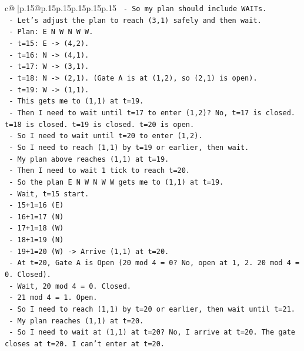 \documentclass{article}
\begin{document}
{\begin{supertabular}{c@{$\;$}|p{.15\linewidth}@{}p{.15\linewidth}p{.15\linewidth}p{.15\linewidth}p{.15\linewidth}p{.15\linewidth}}
{{{\texttt{   {-} So my plan should include WAITs.} \\
\texttt{   {-} Let's adjust the plan to reach (3,1) safely and then wait.} \\
\texttt{   {-} Plan: E N W N W W.} \\
\texttt{   {-} t=15: E {-}> (4,2).} \\
\texttt{   {-} t=16: N {-}> (4,1).} \\
\texttt{   {-} t=17: W {-}> (3,1).} \\
\texttt{   {-} t=18: N {-}> (2,1). (Gate A is at (1,2), so (2,1) is open).} \\
\texttt{   {-} t=19: W {-}> (1,1).} \\
\texttt{   {-} This gets me to (1,1) at t=19.} \\
\texttt{   {-} Then I need to wait until t=17 to enter (1,2)? No, t=17 is closed. t=18 is closed. t=19 is closed. t=20 is open.} \\
\texttt{   {-} So I need to wait until t=20 to enter (1,2).} \\
\texttt{   {-} So I need to reach (1,1) by t=19 or earlier, then wait.} \\
\texttt{   {-} My plan above reaches (1,1) at t=19.} \\
\texttt{   {-} Then I need to wait 1 tick to reach t=20.} \\
\texttt{   {-} So the plan E N W N W W gets me to (1,1) at t=19.} \\
\texttt{   {-} Wait, t=15 start.} \\
\texttt{   {-} 15+1=16 (E)} \\
\texttt{   {-} 16+1=17 (N)} \\
\texttt{   {-} 17+1=18 (W)} \\
\texttt{   {-} 18+1=19 (N)} \\
\texttt{   {-} 19+1=20 (W) {-}> Arrive (1,1) at t=20.} \\
\texttt{   {-} At t=20, Gate A is Open (20 mod 4 = 0? No, open at 1, 2. 20 mod 4 = 0. Closed).} \\
\texttt{   {-} Wait, 20 mod 4 = 0. Closed.} \\
\texttt{   {-} 21 mod 4 = 1. Open.} \\
\texttt{   {-} So I need to reach (1,1) by t=20 or earlier, then wait until t=21.} \\
\texttt{   {-} My plan reaches (1,1) at t=20.} \\
\texttt{   {-} So I need to wait at (1,1) at t=20? No, I arrive at t=20. The gate closes at t=20. I can't enter at t=20.} \\
}}}
\end{supertabular}}
\end{document}

